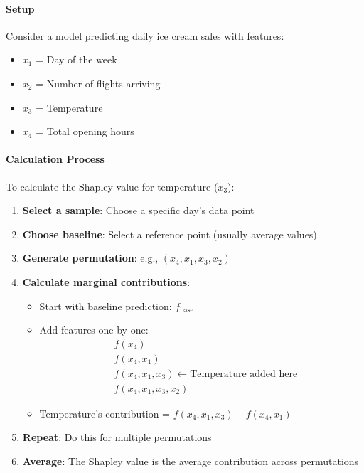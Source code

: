 \documentclass{article}
\begin{document}
\paragraph{Setup}
Consider a model predicting daily ice cream sales with features:
\begin{itemize}
    \item $x_1$ = Day of the week
    \item $x_2$ = Number of flights arriving
    \item $x_3$ = Temperature
    \item $x_4$ = Total opening hours
\end{itemize}

\paragraph{Calculation Process}
To calculate the Shapley value for temperature ($x_3$):

\begin{enumerate}
    \item \textbf{Select a sample}: Choose a specific day's data point
    \item \textbf{Choose baseline}: Select a reference point (usually average values)
    \item \textbf{Generate permutation}: e.g., $(x_4, x_1, x_3, x_2)$
    \item \textbf{Calculate marginal contributions}:
    \begin{itemize}
        \item Start with baseline prediction: $f_\text{base}$
        \item Add features one by one:
            \begin{align*}
                &f(x_4) \\
                &f(x_4, x_1) \\
                &f(x_4, x_1, x_3) \leftarrow \text{Temperature added here} \\
                &f(x_4, x_1, x_3, x_2)
            \end{align*}
        \item Temperature's contribution = $f(x_4, x_1, x_3) - f(x_4, x_1)$
    \end{itemize}
    \item \textbf{Repeat}: Do this for multiple permutations
    \item \textbf{Average}: The Shapley value is the average contribution across permutations
\end{enumerate}
\end{document}
